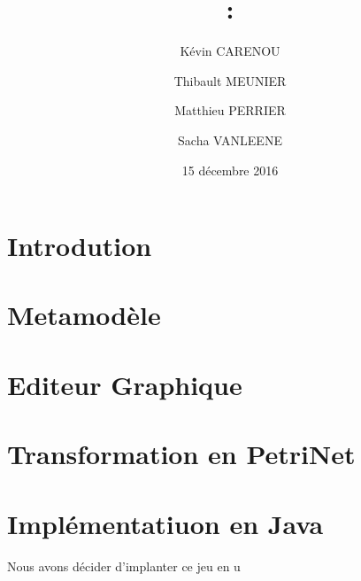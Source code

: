 \documentclass[12pt]{article}
\title{\Matiere:\\ \titre}
\author{Kévin CARENOU \and Thibault MEUNIER \and Matthieu PERRIER \and Sacha VANLEENE}
\date{15 décembre 2016}
\begin{document}
\maketitle

\setcounter{page}{0}
\thispagestyle{empty} %

\newpage

\section*{Introdution}
\lipsum[1]\lipsum[2]
\newpage

\renewcommand{\contentsname}{Sommaire}
\tableofcontents
\newpage

\section{Metamodèle}
\lipsum

\section{Editeur Graphique}
\lipsum

\section{Transformation en PetriNet}
\lipsum

\section{Implémentatiuon en Java}
Nous avons décider d'implanter ce jeu en u
\end{document}
